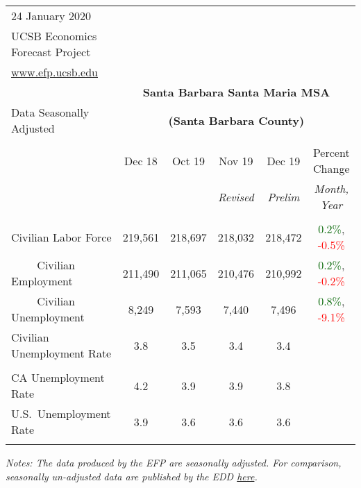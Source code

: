 \documentclass[12pt]{article}
\begin{document}
\begin{table}
\begin{tabular}{|l|c|c|c|c|c|}
\multicolumn{1}{l}{\small 24 January 2020} & \multicolumn{5}{c}{} \\
\multicolumn{1}{l}{\small UCSB Economics Forecast Project} & \multicolumn{5}{c}{} \\
\multicolumn{1}{l}{\small \href{http://www.efp.ucsb.edu/}{www.efp.ucsb.edu}} & \multicolumn{5}{c}{} \\
\multicolumn{1}{c}{} & \multicolumn{5}{c}{\large \textbf{Santa Barbara Santa Maria MSA}} \\
\multicolumn{1}{l}{\small Data Seasonally Adjusted} & \multicolumn{5}{c}{\small \textbf{(Santa Barbara County)}} \\ \hline \hline
& & & & & \\
 & Dec 18 & Oct 19 & Nov 19 & Dec 19 & Percent Change \\
 & & & \small \textit{Revised} & \small \textit{Prelim} & \small \textit{Month, Year} \\ \hline
& & & & & \\
Civilian Labor Force & 219,561 & 218,697 & 218,032 & 218,472 & \textcolor{darkgreen}{0.2\%}, \textcolor{red}{-0.5\%} \\
$\qquad$ \small Civilian Employment & 211,490 & 211,065 & 210,476 & 210,992 & \textcolor{darkgreen}{0.2\%}, \textcolor{red}{-0.2\%} \\
$\qquad$ \small Civilian Unemployment & 8,249 & 7,593 & 7,440 & 7,496 & \textcolor{darkgreen}{0.8\%}, \textcolor{red}{-9.1\%} \\
Civilian Unemployment Rate & 3.8 & 3.5 & 3.4 & 3.4 & \\
& & & & & \\
CA Unemployment Rate & 4.2 & 3.9 & 3.9 & 3.8 & \\
U.S.\ Unemployment Rate & 3.9 & 3.6 & 3.6 & 3.6 & \\
& & & & & \\ \hline \hline
\end{tabular}
\par
\vspace{.5em}
\footnotesize
\textit{Notes: The data produced by the EFP are seasonally adjusted. For comparison, seasonally un-adjusted data are published by the EDD \href{http://www.labormarketinfo.ca.gov/file/lfmonth/satb$pds.pdf}{here}.}
\end{table}
\end{document}
